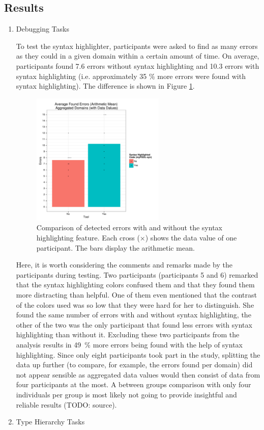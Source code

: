 \documentclass[a4paper,12pt]{report}
\begin{document}
\subsection{Results}
\label{sec-5-2-4}
\begin{enumerate}
\item Debugging Tasks
\label{sec-5-2-4-1}

To test the syntax highlighter, participants were asked to find as
many errors as they could in a given domain within a certain amount of
time. On average, participants found 7.6 errors without syntax
highlighting and 10.3 errors with syntax highlighting (i.e.
approximately 35 \% more errors were found with syntax highlighting). The
difference is shown in Figure \ref{fig:found-errors-combined}.

\begin{figure}[h]
  \centering
  \hspace{0.5cm}
  \includegraphics[width=0.6\textwidth]{found-combined.pdf}
  \caption{Comparison of detected errors with and without the syntax
    highlighting feature. Each cross ($\times$) shows the data value
    of one participant. The bars display the arithmetic mean.}
\label{fig:found-errors-combined}
\end{figure}

Here, it is worth considering the comments and remarks made by the
participants during testing. Two participants (participants 5 and 6)
remarked that the syntax highlighting colors confused them and that
they found them more distracting than helpful. One of them even
mentioned that the contrast of the colors used was so low that they
were hard for her to distinguish. She found the same number of errors
with and without syntax highlighting, the other of the two was the
only participant that found less errors with syntax highlighting than
without it. Excluding these two participants from the analysis results
in 49~\% more errors being found with the help of syntax
highlighting. Since only eight participants took part in the study,
splitting the data up further (to compare, for example, the errors
found per domain) did not appear sensible as aggregated data values
would then consist of data from four participants at the most. A
between groups comparison with only four individuals per group is most
likely not going to provide insightful and reliable results (TODO:
source).
\item Type Hierarchy Tasks
\label{sec-5-2-4-2}


\end{enumerate}
\end{document}
